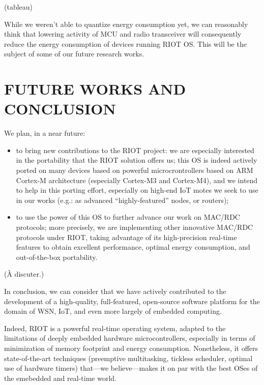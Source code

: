 \documentclass[a4paper,twoside]{article}
\begin{document}
(tableau)

While we weren't able to quantize energy consumption yet, we can reasonably
think that lowering activity of MCU and radio transceiver will consequently
reduce the energy consumption of devices running RIOT OS. This will be
the subject of some of our future research works.


\section{\uppercase{Future Works and Conclusion}}

We plan, in a near future:

\begin{itemize}

\item to bring new contributions to the RIOT project: we are especially
      interested in the portability that the RIOT solution offers us;
      this OS is indeed actively ported on many devices based on powerful
      microcrontrollers based on ARM Cortex-M architecture (especially
      Cortex-M3 and Cortex-M4), and we intend to help in this porting
      effort, especially on high-end IoT motes we seek to use in our
      works (e.g.: as advanced ``highly-featured'' nodes, or routers);

\item to use the power of this OS to further advance our work on MAC/RDC
      protocols; more precisely, we are implementing other innovative
      MAC/RDC protocols under RIOT, taking advantage of its high-precision
      real-time features to obtain excellent performance, optimal energy
      consumption, and out-of-the-box portability.

\end{itemize}

\bigskip
(\`A discuter.)

In conclusion, we can consider that we have actively contributed to the
development of a high-quality, full-featured, open-source software platform
for the domain of WSN, IoT, and even more largely of embedded computing.

Indeed, RIOT is a powerful real-time operating system, adapted to the
limitations of deeply embedded hardware microcontrollers, especially
in terms of minimization of memory footprint and energy consumption.
Nonetheless, it offers state-of-the-art techniques (preemptive
multitasking, tickless scheduler, optimal use of hardware timers)
that---we believe---makes it on par with the best OSes of the
emebedded and real-time world.
\end{document}
